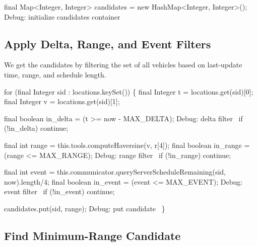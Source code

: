 \nwenddocs{}\endmoddef\nwstartdeflinemarkup{}\nwenddeflinemarkup
final Map<Integer, Integer> candidates = new HashMap<Integer, Integer>();
\LA{}Debug: initialize candidates container~{\nwtagstyle{}}\RA{}
\nwendcode{}\nwdocspar

\subsection{Apply Delta, Range, and Event Filters}

We get the candidates by filtering the set of all vehicles based on last-update
time, range, and schedule length.

\nwenddocs{}\endmoddef\nwstartdeflinemarkup{}\nwenddeflinemarkup
for (final Integer sid : locations.keySet()) \{
  final Integer t = locations.get(sid)[0];
  final Integer v = locations.get(sid)[1];

  final boolean in_delta = (t >= now - MAX_DELTA);
  \LA{}Debug: delta filter~{\nwtagstyle{}}\RA{}
  if (!in_delta)
    continue;

  final int range = this.tools.computeHaversine(v, r[4]);
  final boolean in_range = (range <= MAX_RANGE);
  \LA{}Debug: range filter~{\nwtagstyle{}}\RA{}
  if (!in_range)
    continue;

  final int event =
    this.communicator.queryServerScheduleRemaining(sid, now).length/4;
  final boolean in_event = (event <= MAX_EVENT);
  \LA{}Debug: event filter~{\nwtagstyle{}}\RA{}
  if (!in_event)
    continue;

  candidates.put(sid, range);
  \LA{}Debug: put candidate~{\nwtagstyle{}}\RA{}
\}
\nwendcode{}\nwdocspar

\subsection{Find Minimum-Range Candidate}


